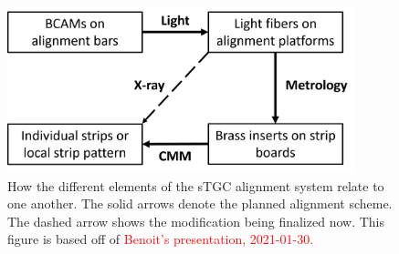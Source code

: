 

\begin{figure}
    \centering
    \includegraphics[width = 0.9\textwidth]{figures/alignment_system_element_relations.png}
    \caption{How the different elements of the sTGC alignment system relate to one another. The solid arrows denote the planned alignment scheme. The dashed arrow shows the modification being finalized now. This figure is based off of \textcolor{red}{Benoit's presentation, 2021-01-30.}}
    \label{fig:alignment_elements}
\end{figure}

